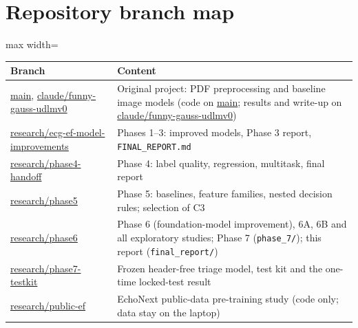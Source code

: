 \appendix
\section{Repository branch map}\label{app:branches}
\begin{table}[H]\centering\small
\begin{adjustbox}{max width=\linewidth}
\begin{tabular}{p{4.6cm}p{10.4cm}}\toprule
Branch & Content \\\midrule
\url{main}, \url{claude/funny-gauss-udlmv0} & Original project: PDF preprocessing and baseline image models (code on \url{main}; results and write-up on \url{claude/funny-gauss-udlmv0}) \\
\url{research/ecg-ef-model-improvements} & Phases 1--3: improved models, Phase 3 report, \texttt{FINAL\_REPORT.md} \\
\url{research/phase4-handoff} & Phase 4: label quality, regression, multitask, final report \\
\url{research/phase5} & Phase 5: baselines, feature families, nested decision rules; selection of C3 \\
\url{research/phase6} & Phase 6 (foundation-model improvement), 6A, 6B and all exploratory studies; Phase 7 (\texttt{phase\_7/}); this report (\texttt{final\_report/}) \\
\url{research/phase7-testkit} & Frozen header-free triage model, test kit and the one-time locked-test result \\
\url{research/public-ef} & EchoNext public-data pre-training study (code only; data stay on the laptop) \\\bottomrule
\end{tabular}
\end{adjustbox}
\end{table}

